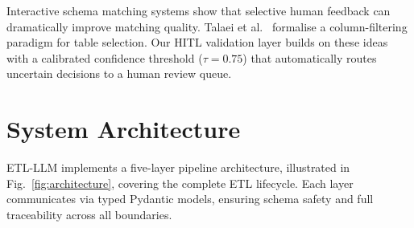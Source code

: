 \documentclass[9pt,a4paper,twocolumn,twoside]{rho-class/rho}
\begin{document}
        Interactive schema matching systems \cite{chai2009efficiently} show that selective human feedback can dramatically improve matching quality. Talaei et al.\ \cite{talaei2024chess} formalise a column-filtering paradigm for table selection. Our HITL validation layer builds on these ideas with a calibrated confidence threshold ($\tau = 0.75$) that automatically routes uncertain decisions to a human review queue.


\section{System Architecture}
\label{sec:architecture}

    \textsc{ETL-LLM} implements a five-layer pipeline architecture, illustrated in Fig.~\ref{fig:architecture}, covering the complete ETL lifecycle. Each layer communicates via typed Pydantic models, ensuring schema safety and full traceability across all boundaries.

\end{document}
